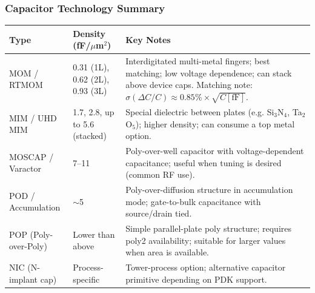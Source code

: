 \begin{frame}
  \frametitle{Capacitor Technology Summary}
  \tiny
  \begin{center}
    \begin{tabular}{p{2.0cm}|p{2.0cm}|p{6.8cm}}
      \hline
      \textbf{Type} & \textbf{Density (fF/$\mu$m$^2$)} & \textbf{Key Notes} \\
      \hline
      MOM / RTMOM &
      0.31 (1L), 0.62 (2L), 0.93 (3L) &
      Interdigitated multi-metal fingers; best matching; low voltage dependence; can stack above device caps. Matching note: $\sigma(\Delta C/C)\approx 0.85\% \times \sqrt{C[\mathrm{fF}]}$. \\
      \hline
      MIM / UHD MIM &
      1.7, 2.8, up to 5.6 (stacked) &
      Special dielectric between plates (e.g. Si$_3$N$_4$, Ta$_2$O$_5$); higher density; can consume a top metal option. \\
      \hline
      MOSCAP / Varactor &
      7--11 &
      Poly-over-well capacitor with voltage-dependent capacitance; useful when tuning is desired (common RF use). \\
      \hline
      POD / Accumulation &
      $\sim$5 &
      Poly-over-diffusion structure in accumulation mode; gate-to-bulk capacitance with source/drain tied. \\
      \hline
      POP (Poly-over-Poly) &
      Lower than above &
      Simple parallel-plate poly structure; requires poly2 availability; suitable for larger values when area is available. \\
      \hline
      NIC (N-implant cap) &
      Process-specific &
      Tower-process option; alternative capacitor primitive depending on PDK support. \\
      \hline
    \end{tabular}
  \end{center}
\end{frame}


